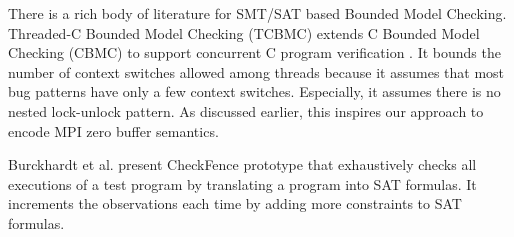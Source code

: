 There is a rich body of literature for SMT/SAT based Bounded Model Checking. 
Threaded-C Bounded Model Checking (TCBMC) extends C Bounded Model Checking (CBMC) \cite{DBLP:conf/tacas/ClarkeKL04, DBLP:conf/dac/ClarkeKY03} to support concurrent C program verification \cite{DBLP:conf/cav/RabinovitzG05}. It bounds the number of context switches allowed among threads because it assumes that most bug patterns have only a few context switches. Especially, it assumes there is no nested lock-unlock pattern. As discussed earlier, this inspires our approach to encode MPI zero buffer semantics.

Burckhardt et al. present CheckFence prototype \cite{DBLP:conf/pldi/BurckhardtAM07} that exhaustively checks all executions of a test program by translating a program into SAT formulas. It increments the observations each time by adding more constraints to SAT formulas. 

